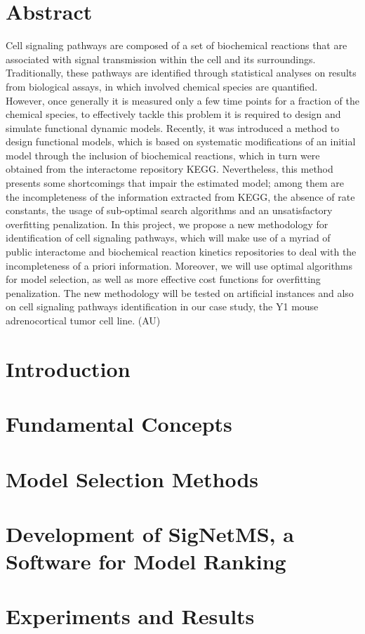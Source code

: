 \documentclass[12pt, twoside]{report}
\numberwithin{mydefinition}{section}
\numberwithin{mytheorem}{section}
\numberwithin{mylemma}{section}
\numberwithin{corollary}{section}
\begin{document}
\chapter*{Abstract}
Cell signaling pathways are composed of a set of biochemical reactions 
that are associated with signal transmission within the cell and its 
surroundings. Traditionally, these pathways are identified through 
statistical analyses on results from biological assays, in which 
involved chemical species are quantified. However, once generally it is 
measured only a few time points for a fraction of the chemical species, 
to effectively tackle this problem it is required to design and simulate 
functional dynamic models. Recently, it was introduced a method to 
design functional models, which is based on systematic modifications of 
an initial model through the inclusion of biochemical reactions, which 
in turn were obtained from the interactome repository KEGG. 
Nevertheless, this method presents some shortcomings that impair the 
estimated model; among them are the incompleteness of the information 
extracted from KEGG, the absence of rate constants, the usage of 
sub-optimal search algorithms and an unsatisfactory overfitting 
penalization. In this project, we propose a new methodology for 
identification of cell signaling pathways, which will make use of a 
myriad of public interactome and biochemical reaction kinetics 
repositories to deal with the incompleteness of a priori information. 
Moreover, we will use optimal algorithms for model selection, as well as 
more effective cost functions for overfitting penalization. The new 
methodology will be tested on artificial instances and also on cell 
signaling pathways identification in our case study, the Y1 mouse 
adrenocortical tumor cell line. (AU)
 
\tableofcontents

\clearpage
{} 

\nocite{*}
\chapter{Introduction}
\label{chap:intro}


\chapter{Fundamental Concepts}
\label{chap:fundamental_concepts}


\chapter{Model Selection Methods}
\label{chap:model_selection}


\chapter{Development of SigNetMS, a Software for Model Ranking}
\label{chap:development_signetms}


\chapter{Experiments and Results}
\label{chap:experiments}


\newpage
\printbibliography
\end{document}
